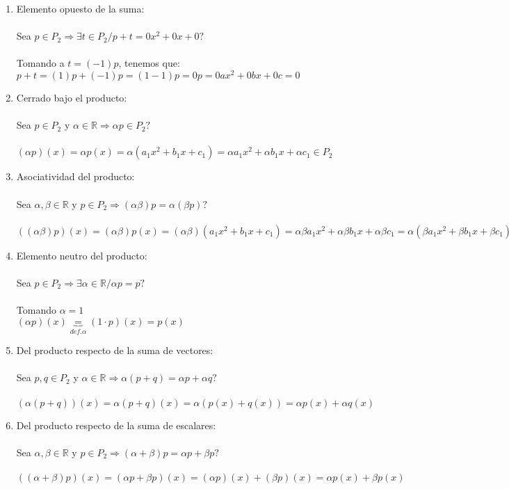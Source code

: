 \documentclass{article}
\begin{document}
\begin{enumerate}[1.]
\begin{enumerate}[(1)]
	Tomando a $s = 0x^2 + 0x + 0$ , tenemos que: \\ \\
	$(p+s)(x) \underbrace{=}_{def.s} p(x)+(0x^2+0x+0) = p(x)$
\item
	Elemento opuesto de la suma: \\ \\
	Sea $p \in P_2 \Rightarrow \exists t \in P_2 / p+t = 0x^2+0x+0?$\\ \\
	Tomando a $t = (-1)p$, tenemos que: \\
	$p+t = (1)p + (-1)p = (1-1)p = 0p = 0ax^2+0bx+0c = 0$
\item
	Cerrado bajo el producto: \\ \\
	Sea $p \in P_2$ y $\alpha \in \mathbb{R} \Rightarrow \alpha p \in P_2?$ \\ \\
	$(\alpha p)(x) = \alpha p(x) =\alpha (a_1x^2 + b_1x + c_1) = \alpha a_1x^2 + \alpha b_1x + \alpha c_1 \in P_2$
\item
	Asociatividad del producto: \\ \\
	Sea $\alpha,\beta \in \mathbb{R}$ y $p \in P_2 \Rightarrow (\alpha \beta)p = \alpha (\beta p)?$ \\ \\
	$((\alpha \beta)p)(x) = (\alpha \beta)p(x) = (\alpha \beta) (a_1x^2 + b_1x + c_1) = \alpha \beta a_1x^2 + \alpha \beta b_1x +
	\alpha \beta c_1 = \alpha ( \beta a_1x^2 + \beta b_1x + \beta c_1) = \alpha \beta ( a_1x^2 + b_1x + c_1) = (\alpha(\beta p))(x)$
\item
	Elemento neutro del producto: \\ \\
	Sea $p \in P_2 \Rightarrow \exists \alpha \in \mathbb{R} / \alpha p = p?$ \\ \\
	Tomando $\alpha = 1$ \\
	$(\alpha p)(x) \underbrace{=}_{def. \alpha} (1 \cdot p)(x) = p(x)$
\item
	Del producto respecto de la suma de vectores: \\ \\
	Sea $p,q \in P_2$ y $\alpha \in \mathbb{R} \Rightarrow \alpha(p+q) = \alpha p + \alpha q?$ \\ \\
	$(\alpha (p+q))(x) = \alpha (p+q)(x) = \alpha(p(x) + q(x)) = \alpha p(x) + \alpha q(x) $
\item
	Del producto respecto de la suma de escalares: \\ \\
	Sea $\alpha , \beta \in \mathbb{R}$ y $p \in P_2 \Rightarrow (\alpha + \beta)p = \alpha p + \beta p?$\\ \\
	$((\alpha + \beta)p)(x) = (\alpha p + \beta p)(x) = (\alpha p)(x) + (\beta p)(x) = \alpha p(x) + \beta p(x)$
\end{enumerate}



\end{enumerate}
\end{document}
